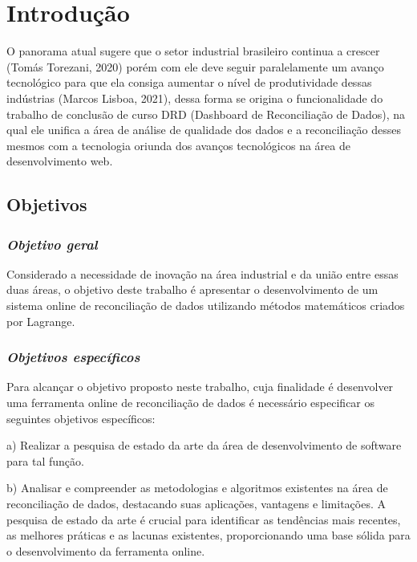 \chapter{Introdução} \label{Introducao}


O panorama atual sugere que o setor industrial brasileiro continua a crescer (Tomás Torezani, 2020) porém com ele deve seguir paralelamente um avanço tecnológico para que ela consiga aumentar o nível de produtividade dessas indústrias (Marcos Lisboa, 2021), dessa forma se origina o funcionalidade do trabalho de conclusão de curso DRD (Dashboard de Reconciliação de Dados), na qual ele unifica a área de análise de qualidade dos dados e a reconciliação desses mesmos com a tecnologia oriunda dos avanços tecnológicos na área de desenvolvimento web.

\section{Objetivos}

\subsection{\textit{Objetivo geral}}

Considerado a necessidade de inovação na área industrial e da união entre essas duas áreas, o objetivo deste trabalho é apresentar o desenvolvimento de um sistema online de reconciliação de dados utilizando métodos matemáticos criados por Lagrange.

\subsection{\textit{Objetivos específicos}}

Para alcançar o objetivo proposto neste trabalho, cuja finalidade é desenvolver uma ferramenta online de reconciliação de dados é necessário especificar os seguintes objetivos específicos:

a) Realizar a pesquisa de estado da arte da área de desenvolvimento de software para tal função.

b) Analisar e compreender as metodologias e algoritmos existentes na área de reconciliação de dados, destacando suas aplicações, vantagens e limitações. A pesquisa de estado da arte é crucial para identificar as tendências mais recentes, as melhores práticas e as lacunas existentes, proporcionando uma base sólida para o desenvolvimento da ferramenta online.

